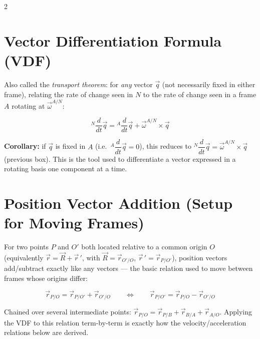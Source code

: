\documentclass[10pt]{article}
\newcommand{\rate}[2]{{}^{#1}\dfrac{d}{dt}#2}
\begin{document}
\begin{multicols}{2}
\section*{Vector Differentiation Formula (VDF)}
Also called the \emph{transport theorem}: for \emph{any} vector $\vec q$ (not necessarily fixed in either frame), relating the rate of change seen in $N$ to the rate of change seen in a frame $A$ rotating at $\vec\omega^{A/N}$:
\begin{keybox}
\[
    \rate{N}{\vec q} = \rate{A}{\vec q} + \vec\omega^{A/N}\times\vec q
\]
\end{keybox}
\textbf{Corollary:} if $\vec q$ is fixed in $A$ (i.e.\ $\rate{A}{\vec q}=0$), this reduces to $\rate{N}{\vec q}=\vec\omega^{A/N}\times\vec q$ (previous box). This is the tool used to differentiate a vector expressed in a rotating basis one component at a time.

\section*{Position Vector Addition (Setup for Moving Frames)}
For two points $P$ and $O'$ both located relative to a common origin $O$ (equivalently $\vec r=\vec R+\vec r\,'$, with $\vec R=\vec r_{O'/O}$, $\vec r\,'=\vec r_{P/O'}$), position vectors add/subtract exactly like any vectors --- the basic relation used to move between frames whose origins differ:
\begin{keybox}
\[
    \vec r_{P/O} = \vec r_{P/O'} + \vec r_{O'/O}
    \qquad\Longleftrightarrow\qquad
    \vec r_{P/O'} = \vec r_{P/O} - \vec r_{O'/O}
\]
\end{keybox}
Chained over several intermediate points: $\vec r_{P/O} = \vec r_{P/B} + \vec r_{B/A} + \vec r_{A/O}$. Applying the VDF to this relation term-by-term is exactly how the velocity/acceleration relations below are derived.


\end{multicols}
\end{document}
